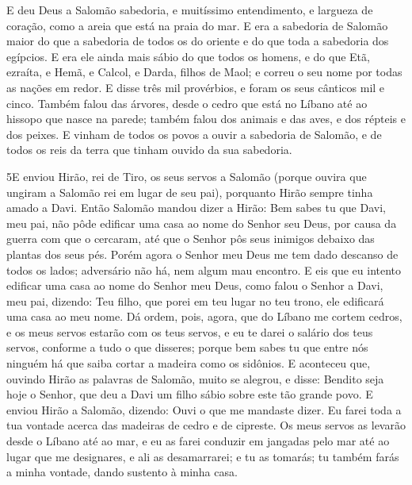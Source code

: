 E deu Deus a Salomão sabedoria, e muitíssimo entendimento, e
largueza de coração, como a areia que está na praia do mar. E
era a sabedoria de Salomão maior do que a sabedoria de todos os do
oriente e do que toda a sabedoria dos egípcios. E era ele
ainda mais sábio do que todos os homens, e do que Etã, ezraíta, e
Hemã, e Calcol, e Darda, filhos de Maol; e correu o seu nome por
todas as nações em redor. E disse três mil provérbios, e
foram os seus cânticos mil e cinco. Também falou das árvores,
desde o cedro que está no Líbano até ao hissopo que nasce na parede;
também falou dos animais e das aves, e dos répteis e dos peixes.
E vinham de todos os povos a ouvir a sabedoria de Salomão, e
de todos os reis da terra que tinham ouvido da sua sabedoria.

\medskip

\lettrine{5} E enviou Hirão, rei de Tiro, os seus servos a
Salomão (porque ouvira que ungiram a Salomão rei em lugar de seu
pai), porquanto Hirão sempre tinha amado a Davi. Então Salomão
mandou dizer a Hirão: Bem sabes tu que Davi, meu pai, não pôde
edificar uma casa ao nome do Senhor seu Deus, por causa da guerra
com que o cercaram, até que o Senhor pôs seus inimigos debaixo das
plantas dos seus pés. Porém agora o Senhor meu Deus me tem dado
descanso de todos os lados; adversário não há, nem algum mau
encontro. E eis que eu intento edificar uma casa ao nome do
Senhor meu Deus, como falou o Senhor a Davi, meu pai, dizendo: Teu
filho, que porei em teu lugar no teu trono, ele edificará uma casa
ao meu nome. Dá ordem, pois, agora, que do Líbano me cortem
cedros, e os meus servos estarão com os teus servos, e eu te darei o
salário dos teus servos, conforme a tudo o que disseres; porque bem
sabes tu que entre nós ninguém há que saiba cortar a madeira como os
sidônios. E aconteceu que, ouvindo Hirão as palavras de Salomão,
muito se alegrou, e disse: Bendito seja hoje o Senhor, que deu a
Davi um filho sábio sobre este tão grande povo. E enviou Hirão a
Salomão, dizendo: Ouvi o que me mandaste dizer. Eu farei toda a tua
vontade acerca das madeiras de cedro e de cipreste. Os meus
servos as levarão desde o Líbano até ao mar, e eu as farei conduzir
em jangadas pelo mar até ao lugar que me designares, e ali as
desamarrarei; e tu as tomarás; tu também farás a minha vontade,
dando sustento à minha casa.

